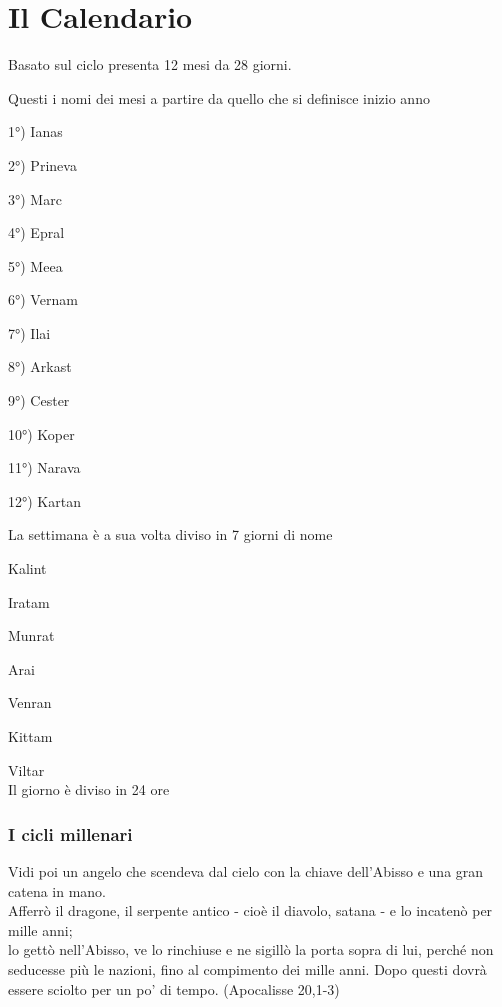 \documentclass[a4paper,11pt,twoside,openany]{book}
\begin{document}
\section{Il Calendario}

\label{il-calendario}

Basato sul ciclo presenta 12 mesi da 28 giorni.

Questi i nomi dei mesi a partire da quello che si definisce inizio
anno
\bigskip

1°) Ianas

2°) Prineva

3°) Marc

4°) Epral

5°) Meea

6°) Vernam

7°) Ilai

8°) Arkast

9°) Cester

10°) Koper

11°) Narava

12°) Kartan

\bigskip
La settimana è a sua volta diviso in 7 giorni di nome

Kalint

Iratam

Munrat

Arai

Venran

Kittam

Viltar\\

Il giorno è diviso in 24 ore


\subsubsection{I cicli millenari}

\begin{tcolorbox}[enhanced,arc=5pt,boxrule=0.3pt]{
		Vidi poi un angelo che scendeva dal cielo con la chiave dell'Abisso e una gran catena in mano.\\
		Afferrò il dragone, il serpente antico - cioè il diavolo, satana - e lo incatenò per mille anni; \\
		lo gettò nell'Abisso, ve lo rinchiuse e ne sigillò la porta sopra di lui, perché non seducesse più le nazioni, fino al compimento dei mille anni. Dopo questi dovrà essere sciolto per un po' di tempo. (Apocalisse 20,1-3)
	}\end{tcolorbox}\medskip
\end{document}
